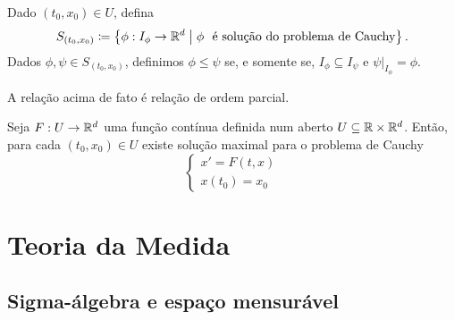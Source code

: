 \begin{defi}
	Dado $(t_0,x_0) \in U$, defina
	\begin{equation*}
	S_{(t_0,x_0)} \coloneqq \set{\phi: I_\phi \to \R^d}{\phi \text{\ \ é solução do problema de Cauchy}}.
	\end{equation*}
Dados $\phi ,\psi \in S_{(t_0,x_0)}$, definimos $\phi \leq \psi $ se, e somente se, $I_{\phi } \subseteq I_{\psi}$ e $\psi|_{I_\phi} = \phi $.
\end{defi}

\begin{prop}
	A relação acima de fato é relação de ordem parcial.
\end{prop}

\begin{teo}
	Seja $F: U \to \mathbb{R}^d$ uma função contínua definida num aberto $U \subseteq \mathbb{R} \times \mathbb{R}^d$. Então, para cada $(t_0,x_0) \in U$ existe solução maximal para o problema de Cauchy
	\begin{equation*}
	\begin{cases}
		x' = F(t,x) \\
		x(t_0)=x_0
	\end{cases}
	\end{equation*}
\end{teo}









































\chapter{Teoria da Medida}

\section{Sigma-álgebra e espaço mensurável}

